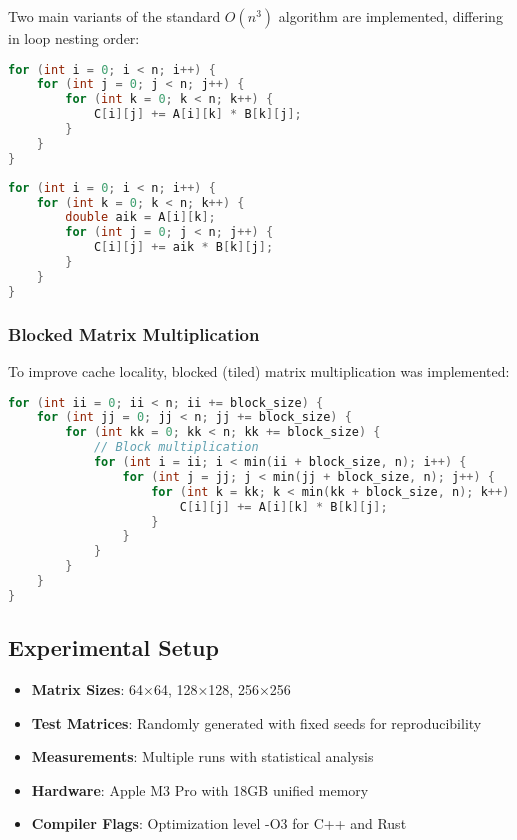 \documentclass[11pt,a4paper]{article}
\begin{document}
Two main variants of the standard $O(n^3)$ algorithm are implemented, differing in loop nesting order:

\begin{lstlisting}[language=C++, caption=i-j-k Loop Order]
for (int i = 0; i < n; i++) {
    for (int j = 0; j < n; j++) {
        for (int k = 0; k < n; k++) {
            C[i][j] += A[i][k] * B[k][j];
        }
    }
}
\end{lstlisting}

\begin{lstlisting}[language=C++, caption=i-k-j Loop Order (Cache Optimized)]
for (int i = 0; i < n; i++) {
    for (int k = 0; k < n; k++) {
        double aik = A[i][k];
        for (int j = 0; j < n; j++) {
            C[i][j] += aik * B[k][j];
        }
    }
}
\end{lstlisting}

\subsubsection{Blocked Matrix Multiplication}

To improve cache locality, blocked (tiled) matrix multiplication was implemented:

\begin{lstlisting}[language=C++, caption=Blocked Matrix Multiplication]
for (int ii = 0; ii < n; ii += block_size) {
    for (int jj = 0; jj < n; jj += block_size) {
        for (int kk = 0; kk < n; kk += block_size) {
            // Block multiplication
            for (int i = ii; i < min(ii + block_size, n); i++) {
                for (int j = jj; j < min(jj + block_size, n); j++) {
                    for (int k = kk; k < min(kk + block_size, n); k++) {
                        C[i][j] += A[i][k] * B[k][j];
                    }
                }
            }
        }
    }
}
\end{lstlisting}

\subsection{Experimental Setup}

\begin{itemize}
    \item \textbf{Matrix Sizes}: 64×64, 128×128, 256×256
    \item \textbf{Test Matrices}: Randomly generated with fixed seeds for reproducibility
    \item \textbf{Measurements}: Multiple runs with statistical analysis
    \item \textbf{Hardware}: Apple M3 Pro with 18GB unified memory
    \item \textbf{Compiler Flags}: Optimization level -O3 for C++ and Rust
\end{itemize}
\end{document}
